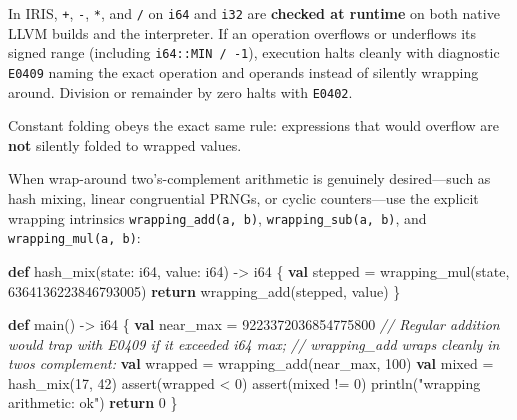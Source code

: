 \documentclass[
  english,
  oneside]{book}
\newenvironment{Shaded}{\begin{snugshade}}{\end{snugshade}}
\newcommand{\CommentTok}[1]{\textcolor[rgb]{0.42,0.60,0.33}{\textit{#1}}}
\newcommand{\ControlFlowTok}[1]{\textcolor[rgb]{0.77,0.53,0.75}{\textbf{#1}}}
\newcommand{\DataTypeTok}[1]{\textcolor[rgb]{0.31,0.79,0.69}{#1}}
\newcommand{\DecValTok}[1]{\textcolor[rgb]{0.71,0.81,0.66}{#1}}
\newcommand{\FunctionTok}[1]{\textcolor[rgb]{0.86,0.86,0.67}{#1}}
\newcommand{\KeywordTok}[1]{\textcolor[rgb]{0.34,0.61,0.84}{\textbf{#1}}}
\newcommand{\NormalTok}[1]{\textcolor[rgb]{0.83,0.83,0.83}{#1}}
\newcommand{\OperatorTok}[1]{\textcolor[rgb]{0.83,0.83,0.83}{#1}}
\newcommand{\StringTok}[1]{\textcolor[rgb]{0.81,0.57,0.47}{#1}}
\begin{document}
In IRIS, \texttt{+}, \texttt{-}, \texttt{*}, and \texttt{/} on
\texttt{i64} and \texttt{i32} are \textbf{checked at runtime} on both
native LLVM builds and the interpreter. If an operation overflows or
underflows its signed range (including \texttt{i64::MIN\ /\ -1}),
execution halts cleanly with diagnostic \texttt{E0409} naming the exact
operation and operands instead of silently wrapping around. Division or
remainder by zero halts with \texttt{E0402}.

Constant folding obeys the exact same rule: expressions that would
overflow are \textbf{not} silently folded to wrapped values.

When wrap-around two's-complement arithmetic is genuinely desired---such
as hash mixing, linear congruential PRNGs, or cyclic counters---use the
explicit wrapping intrinsics \texttt{wrapping\_add(a,\ b)},
\texttt{wrapping\_sub(a,\ b)}, and \texttt{wrapping\_mul(a,\ b)}:

\begin{Shaded}
\begin{Highlighting}[]
\KeywordTok{def}\NormalTok{ hash\_mix(state: }\DataTypeTok{i64}\NormalTok{, value: }\DataTypeTok{i64}\NormalTok{) }\OperatorTok{{-}\textgreater{}} \DataTypeTok{i64}\NormalTok{ \{}
    \KeywordTok{val}\NormalTok{ stepped }\OperatorTok{=}\NormalTok{ wrapping\_mul(state, }\DecValTok{6364136223846793005}\NormalTok{)}
    \ControlFlowTok{return}\NormalTok{ wrapping\_add(stepped, value)}
\NormalTok{\}}

\KeywordTok{def}\NormalTok{ main() }\OperatorTok{{-}\textgreater{}} \DataTypeTok{i64}\NormalTok{ \{}
    \KeywordTok{val}\NormalTok{ near\_max }\OperatorTok{=} \DecValTok{9223372036854775800}
    \CommentTok{// Regular addition would trap with E0409 if it exceeded i64 max;}
    \CommentTok{// wrapping\_add wraps cleanly in two\textquotesingle{}s complement:}
    \KeywordTok{val}\NormalTok{ wrapped }\OperatorTok{=}\NormalTok{ wrapping\_add(near\_max, }\DecValTok{100}\NormalTok{)}
    \KeywordTok{val}\NormalTok{ mixed }\OperatorTok{=}\NormalTok{ hash\_mix(}\DecValTok{17}\NormalTok{, }\DecValTok{42}\NormalTok{)}
    \FunctionTok{assert}\NormalTok{(wrapped }\OperatorTok{\textless{}} \DecValTok{0}\NormalTok{)}
    \FunctionTok{assert}\NormalTok{(mixed }\OperatorTok{!=} \DecValTok{0}\NormalTok{)}
\NormalTok{    println(}\StringTok{"wrapping arithmetic: ok"}\NormalTok{)}
    \ControlFlowTok{return} \DecValTok{0}
\NormalTok{\}}
\end{Highlighting}
\end{Shaded}
\end{document}
